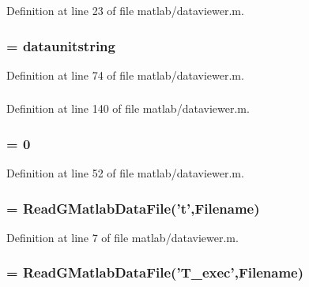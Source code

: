 Definition at line 23 of file matlab/dataviewer.m.
\subsubsection[{r\_\-4\_\-unitstring}]{ = {\bf dataunitstring}}\label{matlab_2dataviewer_8m_a1c337c69eb8c0fb5925e7002c5dfedb9}


Definition at line 74 of file matlab/dataviewer.m.
\subsubsection[{return}]{}\label{matlab_2dataviewer_8m_a9717e7bbecb906637e86cef6da3d83c2}


Definition at line 140 of file matlab/dataviewer.m.
\subsubsection[{status}]{ = 0}\label{matlab_2dataviewer_8m_a015eb90e0de9f16e87bd149d4b9ce959}


Definition at line 52 of file matlab/dataviewer.m.
\subsubsection[{t}]{ = ReadGMatlabDataFile('{\bf t}',{\bf Filename})}\label{matlab_2dataviewer_8m_aaccc9105df5383111407fd5b41255e23}


Definition at line 7 of file matlab/dataviewer.m.
\subsubsection[{T\_\-exec}]{ = ReadGMatlabDataFile('{\bf T\_\-exec}',{\bf Filename})}\label{matlab_2dataviewer_8m_aa27539c17337ed197558bac383aa4023}


